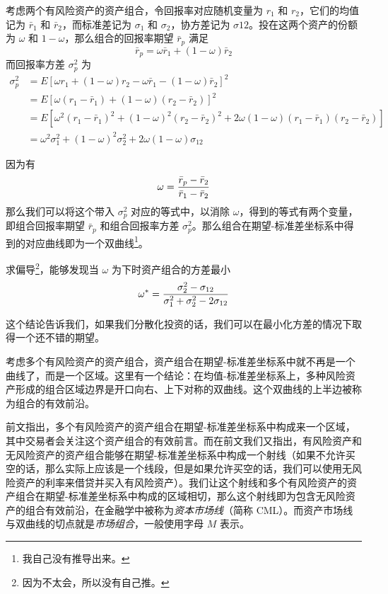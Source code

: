 \documentclass[utf8,a4paper,nofonts,9pt]{ctexbook}
\begin{document}
考虑两个有风险资产的资产组合，令回报率对应随机变量为 $r_1$ 和 $r_2$，它们的均值记为 $\bar{r}_1$ 和 $\bar{r}_2$，而标准差记为 $\sigma_1$ 和 $\sigma_2$，协方差记为 $\sigma{12}$。投在这两个资产的份额为 $\omega$ 和 $1 - \omega$，那么组合的回报率期望 $\bar{r}_p$ 满足
\[
    \bar{r}_p = \omega \bar{r}_1 + (1 - \omega) \bar{r}_2
\]
而回报率方差 $\sigma^2_p$ 为
\begin{align*}
    \sigma^2_p & = E\left[ \omega r_1 + (1 - \omega) r_2 - \omega \bar{r}_1 - (1 - \omega) \bar{r}_2 \right]^2 \\
               & = E\left[ \omega (r_1 - \bar{r}_1) + (1 - \omega) (r_2 - \bar{r}_2) \right]^2 \\
               & = E\left[ \omega^2 (r_1 - \bar{r}_1)^2 + (1 - \omega)^2 (r_2 - \bar{r}_2)^2 + 2 \omega (1 - \omega) (r_1 - \bar{r}_1) (r_2 - \bar{r}_2) \right] \\
               & = \omega^2 \sigma_1^2 + (1 - \omega)^2 \sigma_2^2 + 2 \omega (1 - \omega) \sigma_{12}
\end{align*}

因为有
\[
    \omega = {\bar{r}_p - \bar{r}_2 \over \bar{r}_1 - \bar{r}_2}
\]
那么我们可以将这个带入 $\sigma^2_p$ 对应的等式中，以消除 $\omega$，得到的等式有两个变量，即组合回报率期望 $\bar{r}_p$ 和组合回报率方差 $\sigma^2_p$。那么组合在期望-标准差坐标系中得到的对应曲线即为一个双曲线\footnote{我自己没有推导出来。}。

求偏导\footnote{因为不太会，所以没有自己推。}，能够发现当 $\omega$ 为下时资产组合的方差最小
\[
    \omega^* = {\sigma_2^2 - \sigma_{12} \over \sigma_1^2 + \sigma_2^2 - 2 \sigma_{12}}
\]

这个结论告诉我们，如果我们分散化投资的话，我们可以在最小化方差的情况下取得一个还不错的期望。

考虑多个有风险资产的资产组合，资产组合在期望-标准差坐标系中就不再是一个曲线了，而是一个区域。这里有一个结论：在均值-标准差坐标系上，多种风险资产形成的组合区域边界是开口向右、上下对称的双曲线。这个双曲线的上半边被称为组合的有效前沿。

前文指出，多个有风险资产的资产组合在期望-标准差坐标系中构成来一个区域，其中交易者会关注这个资产组合的有效前言。而在前文我们又指出，有风险资产和无风险资产的资产组合能够在期望-标准差坐标系中构成一个射线（如果不允许买空的话，那么实际上应该是一个线段，但是如果允许买空的话，我们可以使用无风险资产的利率来借贷并买入有风险资产）。我们让这个射线和多个有风险资产的资产组合在期望-标准差坐标系中构成的区域相切，那么这个射线即为包含无风险资产的组合有效前沿，在金融学中被称为\emph{资本市场线}（简称
CML）。而资产市场线与双曲线的切点就是\emph{市场组合}，一般使用字母 $M$ 表示。
\end{document}
